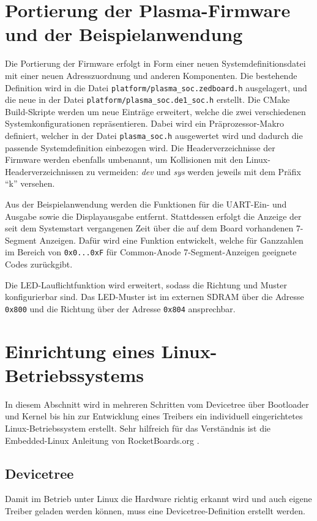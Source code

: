 \section{Portierung der Plasma-Firmware und der Beispielanwendung}
\label{sec:impl_port_plasma_sw_to_de1_soc}
Die Portierung der Firmware erfolgt in Form einer neuen Systemdefinitionsdatei mit einer neuen Adresszuordnung und anderen Komponenten. Die bestehende Definition wird in die Datei \texttt{platform/plasma\_soc.zedboard.h} ausgelagert, und die neue in der Datei \texttt{platform/plasma\_soc.de1\_soc.h} erstellt. Die CMake Build-Skripte werden um neue Einträge erweitert, welche die zwei verschiedenen Systemkonfigurationen repräsentieren. Dabei wird ein Präprozessor-Makro definiert, welcher in der Datei \texttt{plasma\_soc.h} ausgewertet wird und dadurch die passende Systemdefinition einbezogen wird.
Die Headerverzeichnisse der Firmware werden ebenfalls umbenannt, um Kollisionen mit den Linux-Headerverzeichnissen zu vermeiden: \textit{dev} und \textit{sys} werden jeweils mit dem Präfix \enquote{k} versehen. 

Aus der Beispielanwendung werden die Funktionen für die \gls{UART}-Ein- und Ausgabe sowie die Displayausgabe entfernt. 
Stattdessen erfolgt die Anzeige der seit dem Systemstart vergangenen Zeit über die auf dem Board vorhandenen 7-Segment Anzeigen. Dafür wird eine Funktion entwickelt, welche für Ganzzahlen im Bereich von \texttt{0x0...0xF} für Common-Anode 7-Segment-Anzeigen geeignete Codes zurückgibt.

Die LED-Lauflichtfunktion wird erweitert, sodass die Richtung und Muster konfigurierbar sind. Das LED-Muster ist im externen SDRAM über die Adresse \texttt{0x800} und die Richtung über der Adresse \texttt{0x804} ansprechbar.

\section{Einrichtung eines Linux-Betriebssystems}
\label{sec:impl_setup_linuxfor_de1_soc}

In diesem Abschnitt wird in mehreren Schritten vom Devicetree über Bootloader und Kernel bis hin zur Entwicklung eines Treibers ein individuell eingerichtetes Linux-Betriebssystem erstellt. Sehr hilfreich für das Verständnis ist die Embedded-Linux Anleitung von RocketBoards.org \cite{website:embedded_linux_beginners_guide}.
\subsection{Devicetree}
\label{sec:impl_devicetree}
Damit im Betrieb unter Linux die Hardware richtig erkannt wird und auch eigene Treiber geladen werden können, muss eine Devicetree-Definition erstellt werden. 

